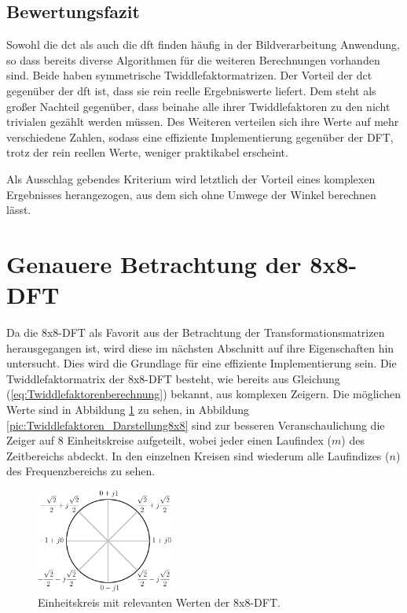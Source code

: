  
 \subsection{Bewertungsfazit}
 Sowohl die \gls{dct} als auch die \gls{dft} finden häufig in der Bildverarbeitung Anwendung, so dass bereits diverse Algorithmen für die weiteren
 Berechnungen vorhanden sind. Beide haben symmetrische Twiddlefaktormatrizen.
 Der Vorteil der \gls{dct} gegenüber der \gls{dft} ist, dass sie rein reelle Ergebniswerte liefert. 
 Dem steht als großer Nachteil gegenüber, dass beinahe alle ihrer Twiddlefaktoren zu den nicht trivialen gezählt werden müssen. 
 Des Weiteren verteilen sich ihre Werte auf mehr verschiedene Zahlen, sodass eine effiziente Implementierung gegenüber der DFT, trotz der rein reellen
 Werte, weniger praktikabel erscheint.
 
 Als Ausschlag gebendes Kriterium wird letztlich der Vorteil eines komplexen Ergebnisses herangezogen, aus dem sich ohne Umwege der Winkel berechnen lässt.

 

 
 
 \section{Genauere Betrachtung der 8x8-DFT}\label{sec:AnalyseGenauereBetrachtung8x8}
 Da die 8x8-DFT als Favorit aus der Betrachtung der Transformationsmatrizen herausgegangen ist, wird diese im nächsten Abschnitt auf ihre Eigenschaften
 hin untersucht. Dies wird die Grundlage für eine effiziente Implementierung sein. 
 Die Twiddlefaktormatrix der 8x8-DFT besteht, wie bereits aus Gleichung (\ref{eq:Twiddlefaktorenberechnung}) bekannt, aus komplexen Zeigern.
 Die möglichen Werte sind in Abbildung \ref{pic:Einheitskreis_Faktoren} zu sehen, 
 in Abbildung \ref{pic:Twiddlefaktoren_Darstellung8x8} sind zur besseren Veranschaulichung die Zeiger auf 8 Einheitskreise aufgeteilt,
 wobei jeder einen Laufindex ($m$) des Zeitbereichs abdeckt. In den einzelnen Kreisen sind wiederum alle Laufindizes ($n$) des Frequenzbereichs zu sehen.
 
  \begin{figure}[!h]
  \centering
  \includegraphics[width=0.4\textwidth]{img/Einheitskreis-crop.pdf}
  \caption{Einheitskreis mit relevanten Werten der 8x8-DFT.}
  \label{pic:Einheitskreis_Faktoren}
\end{figure}
  
